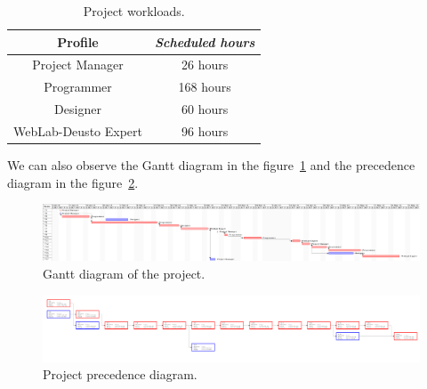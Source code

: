 \begin{table}[h]
	\centering
	\caption{Project workloads.}\label{tab:work}
	\begin{tabular}{cc}
		\toprule
		\textbf{Profile} & \emph{Scheduled hours} \\
		\midrule
		Project Manager			&	26 hours	\\
		Programmer				&	168 hours	\\
		Designer				&	60 hours	\\
		WebLab-Deusto Expert	&	96 hours	\\
		\bottomrule
	\end{tabular}
\end{table}

We can also observe the Gantt diagram in the figure~\ref{fig:gantt} and the precedence diagram in
the figure~\ref{fig:precedence}.

\begin{figure}
	\centering
	\includegraphics[width=0.95\textheight, angle=90]{fig/gantt}
	\caption{Gantt diagram of the project.}\label{fig:gantt}
\end{figure}

\begin{figure}
	\centering
	\includegraphics[width=0.95\textheight, angle=90]{fig/precedence}
	\caption{Project precedence diagram.}\label{fig:precedence}
\end{figure}
